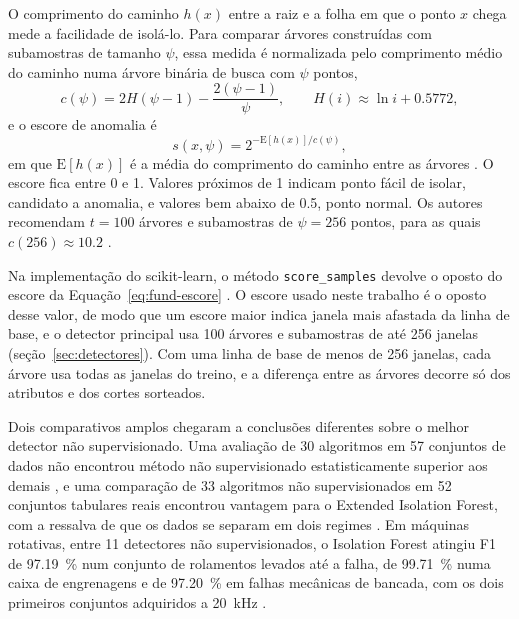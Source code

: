 O comprimento do caminho $h(x)$ entre a raiz e a folha em que o ponto $x$ chega mede a facilidade de isolá-lo. Para comparar árvores construídas com subamostras de tamanho $\psi$, essa medida é normalizada pelo comprimento médio do caminho numa árvore binária de busca com $\psi$ pontos,
\begin{equation}
c(\psi) = 2H(\psi-1) - \frac{2(\psi-1)}{\psi}, \qquad H(i) \approx \ln i + \num{0,5772},
\label{eq:fund-cpsi}
\end{equation}
e o escore de anomalia é
\begin{equation}
s(x, \psi) = 2^{-\mathrm{E}[h(x)]/c(\psi)},
\label{eq:fund-escore}
\end{equation}
em que $\mathrm{E}[h(x)]$ é a média do comprimento do caminho entre as árvores \cite{liu2008}. O escore fica entre 0 e 1. Valores próximos de 1 indicam ponto fácil de isolar, candidato a anomalia, e valores bem abaixo de \num{0,5}, ponto normal. Os autores recomendam $t = 100$ árvores e subamostras de $\psi = 256$ pontos, para as quais $c(256) \approx \num{10,2}$ \cite{liu2008}.

Na implementação do scikit-learn, o método \texttt{score\_samples} devolve o oposto do escore da Equação~\eqref{eq:fund-escore} \cite{scikitlearn2026}. O escore usado neste trabalho é o oposto desse valor, de modo que um escore maior indica janela mais afastada da linha de base, e o detector principal usa \num{100} árvores e subamostras de até \num{256} janelas (seção~\ref{sec:detectores}). Com uma linha de base de menos de \num{256} janelas, cada árvore usa todas as janelas do treino, e a diferença entre as árvores decorre só dos atributos e dos cortes sorteados.

Dois comparativos amplos chegaram a conclusões diferentes sobre o melhor detector não supervisionado. Uma avaliação de \num{30} algoritmos em \num{57} conjuntos de dados não encontrou método não supervisionado estatisticamente superior aos demais \cite{han2022}, e uma comparação de \num{33} algoritmos não supervisionados em \num{52} conjuntos tabulares reais encontrou vantagem para o Extended Isolation Forest, com a ressalva de que os dados se separam em dois regimes \cite{bouman2024}. Em máquinas rotativas, entre \num{11} detectores não supervisionados, o Isolation Forest atingiu F1 de \SI{97,19}{\percent} num conjunto de rolamentos levados até a falha, de \SI{99,71}{\percent} numa caixa de engrenagens e de \SI{97,20}{\percent} em falhas mecânicas de bancada, com os dois primeiros conjuntos adquiridos a \SI{20}{\kilo\hertz} \cite{brito2022}.

